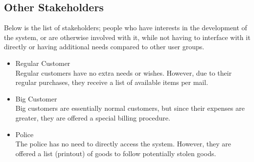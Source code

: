 \subsection{Other Stakeholders}
Below is the list of stakeholders; people who have interests in the development of the system, or are otherwise involved with it, while not having to interface with it directly or having additional needs compared to other user groups.
\begin{itemize}[noitemsep]
	\item Regular Customer\\
		Regular customers have no extra needs or wishes. However, due to their regular purchases, they receive a list of available items per mail.
	\item Big Customer\\
		Big customers are essentially normal customers, but since their expenses are greater, they are offered a special billing procedure.
	\item Police\\
		The police has no need to directly access the system. However, they are offered a list (printout) of goods to follow potentially stolen goods.
\end{itemize}

